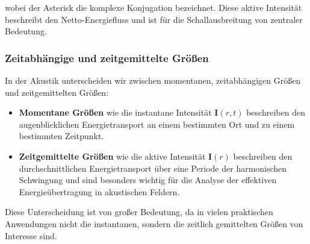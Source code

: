 \noindent wobei der Asterisk die komplexe Konjugation bezeichnet. Diese aktive Intensität beschreibt den Netto-Energiefluss und ist für die Schallausbreitung von zentraler Bedeutung.

\subsubsection{Zeitabhängige und zeitgemittelte Größen}

In der Akustik unterscheiden wir zwischen momentanen, zeitabhängigen Größen und zeitgemittelten Größen:

\begin{itemize}
\item \textbf{Momentane Größen} wie die instantane Intensität $\mathbf{I}(r,t)$ beschreiben den augenblicklichen Energietransport an einem bestimmten Ort und zu einem bestimmten Zeitpunkt.

\item \textbf{Zeitgemittelte Größen} wie die aktive Intensität $\mathbf{I}(r)$ beschreiben den durchschnittlichen Energietransport über eine Periode der harmonischen Schwingung und sind besonders wichtig für die Analyse der effektiven Energieübertragung in akustischen Feldern.
\end{itemize}

\noindent Diese Unterscheidung ist von großer Bedeutung, da in vielen praktischen Anwendungen nicht die instantanen, sondern die zeitlich gemittelten Größen von Interesse sind.




